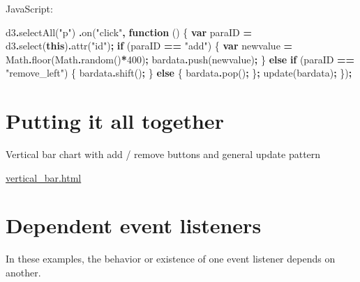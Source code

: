 \documentclass[
  openany]{book}
\newenvironment{Shaded}{\begin{snugshade}}{\end{snugshade}}
\newcommand{\BuiltInTok}[1]{#1}
\newcommand{\ControlFlowTok}[1]{\textcolor[rgb]{0.13,0.29,0.53}{\textbf{#1}}}
\newcommand{\DecValTok}[1]{\textcolor[rgb]{0.00,0.00,0.81}{#1}}
\newcommand{\FunctionTok}[1]{\textcolor[rgb]{0.00,0.00,0.00}{#1}}
\newcommand{\KeywordTok}[1]{\textcolor[rgb]{0.13,0.29,0.53}{\textbf{#1}}}
\newcommand{\NormalTok}[1]{#1}
\newcommand{\OperatorTok}[1]{\textcolor[rgb]{0.81,0.36,0.00}{\textbf{#1}}}
\newcommand{\StringTok}[1]{\textcolor[rgb]{0.31,0.60,0.02}{#1}}
\begin{document}
JavaScript:

\begin{Shaded}
\begin{Highlighting}[]
\NormalTok{d3}\OperatorTok{.}\FunctionTok{selectAll}\NormalTok{(}\StringTok{"p"}\NormalTok{)}
    \OperatorTok{.}\FunctionTok{on}\NormalTok{(}\StringTok{"click"}\OperatorTok{,} \KeywordTok{function}\NormalTok{ () \{}
      \KeywordTok{var}\NormalTok{ paraID }\OperatorTok{=}\NormalTok{ d3}\OperatorTok{.}\FunctionTok{select}\NormalTok{(}\KeywordTok{this}\NormalTok{)}\OperatorTok{.}\FunctionTok{attr}\NormalTok{(}\StringTok{"id"}\NormalTok{)}\OperatorTok{;}
      \ControlFlowTok{if}\NormalTok{ (paraID }\OperatorTok{==} \StringTok{"add"}\NormalTok{) \{}
          \KeywordTok{var}\NormalTok{ newvalue }\OperatorTok{=} \BuiltInTok{Math}\OperatorTok{.}\FunctionTok{floor}\NormalTok{(}\BuiltInTok{Math}\OperatorTok{.}\FunctionTok{random}\NormalTok{()}\OperatorTok{*}\DecValTok{400}\NormalTok{)}\OperatorTok{;}
\NormalTok{          bardata}\OperatorTok{.}\FunctionTok{push}\NormalTok{(newvalue)}\OperatorTok{;}
\NormalTok{          \} }\ControlFlowTok{else} \ControlFlowTok{if}\NormalTok{ (paraID }\OperatorTok{==} \StringTok{"remove\_left"}\NormalTok{) \{}
\NormalTok{          bardata}\OperatorTok{.}\FunctionTok{shift}\NormalTok{()}\OperatorTok{;}
\NormalTok{          \} }\ControlFlowTok{else}\NormalTok{ \{}
\NormalTok{          bardata}\OperatorTok{.}\FunctionTok{pop}\NormalTok{()}\OperatorTok{;}
\NormalTok{          \}}\OperatorTok{;}
\NormalTok{      update(bardata)}\OperatorTok{;}
\NormalTok{      \})}\OperatorTok{;}
\end{Highlighting}
\end{Shaded}

\hypertarget{putting-it-all-together}{%
\section{Putting it all together}\label{putting-it-all-together}}

Vertical bar chart with add / remove buttons and general update pattern

\href{code/vertical_bar.html}{vertical\_bar.html}

\hypertarget{dependent-event-listeners}{%
\section{Dependent event listeners}\label{dependent-event-listeners}}

In these examples, the behavior or existence of one event listener depends on another.
\end{document}
